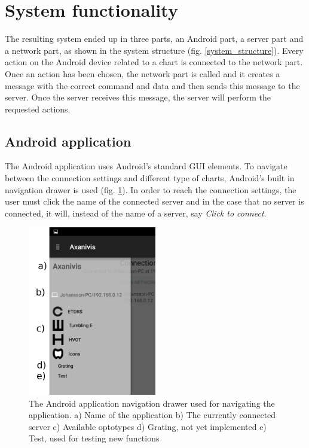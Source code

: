 \documentclass[12pt,a4paper,notitlepage]{report}
\begin{document}
\section{System functionality} 
The resulting system ended up in three parts, an Android part, a server part and a network part, as shown in the system structure (fig. \ref{system_structure}). Every action on the Android device related to a chart is connected to the network part. Once an action has been chosen, the network part is called and it creates a message with the correct command and data and then sends this message to the server. Once the server receives this message, the server will perform the requested actions.

\subsection{Android application}
The Android application uses Android's standard GUI elements. To navigate between the connection settings and different type of charts, Android's built in navigation drawer is used (fig. \ref{fig:app_nav_drawer}). In order to reach the connection settings, the user must click the name of the connected server and in the case that no server is connected, it will, instead of the name of a server, say \textit{Click to connect}.

\begin{figure}[ht!]
\centering
\includegraphics[width=56mm]{images/appgui/nav_drawer.png}
\caption[Android Navigation Drawer]{The Android application navigation drawer used for navigating the application. a) Name of the application b) The currently connected server c) Available optotypes d) Grating, not yet implemented e) Test, used for testing new functions}
\label{fig:app_nav_drawer}
\end{figure}
\end{document}
